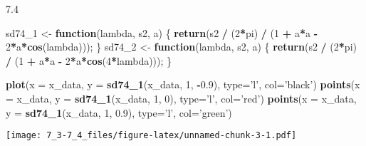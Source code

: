 \documentclass[]{article}
\newenvironment{Shaded}{\begin{snugshade}}{\end{snugshade}}
\newcommand{\KeywordTok}[1]{\textcolor[rgb]{0.13,0.29,0.53}{\textbf{#1}}}
\newcommand{\DataTypeTok}[1]{\textcolor[rgb]{0.13,0.29,0.53}{#1}}
\newcommand{\DecValTok}[1]{\textcolor[rgb]{0.00,0.00,0.81}{#1}}
\newcommand{\FloatTok}[1]{\textcolor[rgb]{0.00,0.00,0.81}{#1}}
\newcommand{\StringTok}[1]{\textcolor[rgb]{0.31,0.60,0.02}{#1}}
\newcommand{\ControlFlowTok}[1]{\textcolor[rgb]{0.13,0.29,0.53}{\textbf{#1}}}
\newcommand{\OperatorTok}[1]{\textcolor[rgb]{0.81,0.36,0.00}{\textbf{#1}}}
\newcommand{\NormalTok}[1]{#1}
\begin{document}
7.4

\begin{Shaded}
\begin{Highlighting}[]
\NormalTok{sd74_}\DecValTok{1}\NormalTok{ <-}\StringTok{ }\ControlFlowTok{function}\NormalTok{(lambda, s2, a) \{}
  \KeywordTok{return}\NormalTok{(s2 }\OperatorTok{/}\StringTok{ }\NormalTok{(}\DecValTok{2}\OperatorTok{*}\NormalTok{pi) }\OperatorTok{/}\StringTok{ }\NormalTok{(}\DecValTok{1} \OperatorTok{+}\StringTok{ }\NormalTok{a}\OperatorTok{*}\NormalTok{a }\OperatorTok{-}\StringTok{ }\DecValTok{2}\OperatorTok{*}\NormalTok{a}\OperatorTok{*}\KeywordTok{cos}\NormalTok{(lambda)));}
\NormalTok{\}}
\NormalTok{sd74_}\DecValTok{2}\NormalTok{ <-}\StringTok{ }\ControlFlowTok{function}\NormalTok{(lambda, s2, a) \{}
  \KeywordTok{return}\NormalTok{(s2 }\OperatorTok{/}\StringTok{ }\NormalTok{(}\DecValTok{2}\OperatorTok{*}\NormalTok{pi) }\OperatorTok{/}\StringTok{ }\NormalTok{(}\DecValTok{1} \OperatorTok{+}\StringTok{ }\NormalTok{a}\OperatorTok{*}\NormalTok{a }\OperatorTok{-}\StringTok{ }\DecValTok{2}\OperatorTok{*}\NormalTok{a}\OperatorTok{*}\KeywordTok{cos}\NormalTok{(}\DecValTok{4}\OperatorTok{*}\NormalTok{lambda)));}
\NormalTok{\}}

\KeywordTok{plot}\NormalTok{(}\DataTypeTok{x =}\NormalTok{ x_data, }\DataTypeTok{y =} \KeywordTok{sd74_1}\NormalTok{(x_data, }\DecValTok{1}\NormalTok{, }\OperatorTok{-}\FloatTok{0.9}\NormalTok{), }\DataTypeTok{type=}\StringTok{'l'}\NormalTok{, }\DataTypeTok{col=}\StringTok{'black'}\NormalTok{)}
\KeywordTok{points}\NormalTok{(}\DataTypeTok{x =}\NormalTok{ x_data, }\DataTypeTok{y =} \KeywordTok{sd74_1}\NormalTok{(x_data, }\DecValTok{1}\NormalTok{, }\DecValTok{0}\NormalTok{), }\DataTypeTok{type=}\StringTok{'l'}\NormalTok{, }\DataTypeTok{col=}\StringTok{'red'}\NormalTok{)}
\KeywordTok{points}\NormalTok{(}\DataTypeTok{x =}\NormalTok{ x_data, }\DataTypeTok{y =} \KeywordTok{sd74_1}\NormalTok{(x_data, }\DecValTok{1}\NormalTok{, }\FloatTok{0.9}\NormalTok{), }\DataTypeTok{type=}\StringTok{'l'}\NormalTok{, }\DataTypeTok{col=}\StringTok{'green'}\NormalTok{)}
\end{Highlighting}
\end{Shaded}

\texttt{[image: 7\_3-7\_4\_files/figure-latex/unnamed-chunk-3-1.pdf]}
\end{document}
